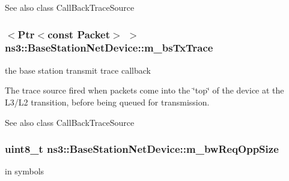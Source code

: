 \begin{DoxySeeAlso}{See also}
class Call\+Back\+Trace\+Source 
\end{DoxySeeAlso}
\subsubsection[{\texorpdfstring{m\+\_\+bs\+Tx\+Trace}{m_bsTxTrace}}]{$<${\bf Ptr}$<$const {\bf Packet}$>$ $>$ ns3\+::\+Base\+Station\+Net\+Device\+::m\+\_\+bs\+Tx\+Trace\hspace{0.3cm}{\ttfamily [private]}}\hypertarget{classns3_1_1BaseStationNetDevice_af52f29795598ce94f2932d351230b251}{}\label{classns3_1_1BaseStationNetDevice_af52f29795598ce94f2932d351230b251}


the base station transmit trace callback 

The trace source fired when packets come into the \char`\"{}top\char`\"{} of the device at the L3/\+L2 transition, before being queued for transmission.

\begin{DoxySeeAlso}{See also}
class Call\+Back\+Trace\+Source 
\end{DoxySeeAlso}
\subsubsection[{\texorpdfstring{m\+\_\+bw\+Req\+Opp\+Size}{m_bwReqOppSize}}]{\setlength{\rightskip}{0pt plus 5cm}uint8\+\_\+t ns3\+::\+Base\+Station\+Net\+Device\+::m\+\_\+bw\+Req\+Opp\+Size\hspace{0.3cm}{\ttfamily [private]}}\hypertarget{classns3_1_1BaseStationNetDevice_a15575fd663403b491e36ffe4291ee696}{}\label{classns3_1_1BaseStationNetDevice_a15575fd663403b491e36ffe4291ee696}


in symbols 

